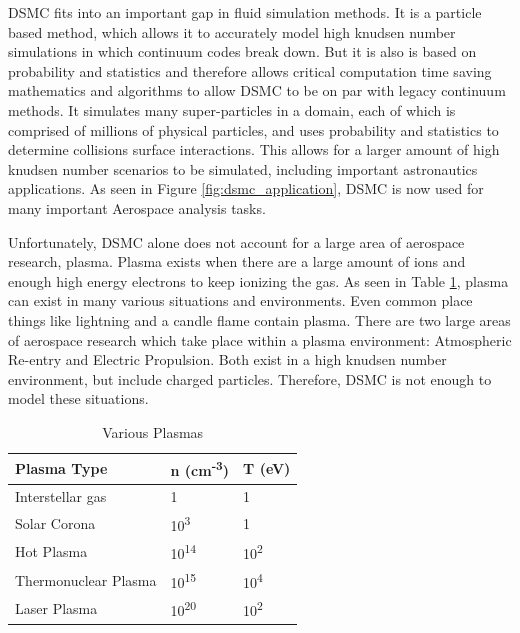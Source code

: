 \indent DSMC fits into an important gap in fluid simulation methods. It is a particle based method, which allows it to accurately model high knudsen number simulations in which continuum codes break down. But it is also is based on probability and statistics and therefore allows critical computation time saving mathematics and algorithms to allow DSMC to be on par with legacy continuum methods. It simulates many super-particles in a domain, each of which is comprised of millions of physical particles, and uses probability and statistics to determine collisions surface interactions. This allows for a larger amount of high knudsen number scenarios to be simulated, including important astronautics applications. As seen in Figure \ref{fig:dsmc_application}, DSMC is now used for many important Aerospace analysis tasks. \par



\indent Unfortunately, DSMC alone does not account for a large area of aerospace research, plasma. Plasma exists when there are a large amount of ions and enough high energy electrons to keep ionizing the gas. As seen in Table \ref{tab:plasma}, plasma can exist in many various situations and environments. Even common place things like lightning and a candle flame contain plasma. There are two large areas of aerospace research which take place within a plasma environment: Atmospheric Re-entry and Electric Propulsion. Both exist in a high knudsen number environment, but include charged particles. Therefore, DSMC is not enough to model these situations. \par


\begin{table}
\label{tab:plasma}
\caption{Various Plasmas\cite{plasma_table}}
\vspace{0.3cm}
\begin{center}
\begin{tabular}{|lll|}
\hline
Plasma Type          & n (cm\textsuperscript{-3}) & T (eV)                  \\ \hline
Interstellar gas     & 1                        & 1                     \\
Solar Corona         & 10\textsuperscript{3}    & 1                     \\
Hot Plasma           & 10\textsuperscript{14}   & 10\textsuperscript{2} \\
Thermonuclear Plasma & 10\textsuperscript{15}   & 10\textsuperscript{4} \\
Laser Plasma         & 10\textsuperscript{20}   & 10\textsuperscript{2} \\ \hline
\end{tabular}
\end{center}
\end{table}

